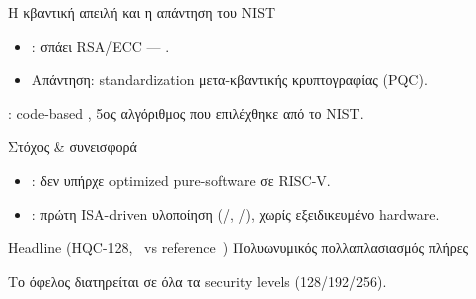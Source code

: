\documentclass[aspectratio=169,10pt]{beamer}
\begin{document}
\begin{frame}{Η κβαντική απειλή και η απάντηση του NIST}
  \begin{itemize}
    \item {}: σπάει RSA/ECC — .
    \item Απάντηση: standardization μετα-κβαντικής κρυπτογραφίας (PQC).
  \end{itemize}
  \vspace{0.4em}
  \begin{center}
  \end{center}
  \vspace{0.2em}
  {\footnotesize \HQC: code-based \KEM, 5ος αλγόριθμος που επιλέχθηκε από το NIST.\par}
  \cite{Shor1997,NIST-HQC-selection2025}
\end{frame}

\begin{frame}{Στόχος \& συνεισφορά}
  \begin{itemize}
    \item {}: δεν υπήρχε optimized pure-software \HQC σε RISC-V.
    \item {}: πρώτη ISA-driven υλοποίηση (\Zbc/\Zvbc, \Zbb/\Zvbb),
          χωρίς εξειδικευμένο hardware.
  \end{itemize}
  \begin{block}{Headline (HQC-128, \instret\ vs reference~\cite{HQC-reference-impl})}
    Πολυωνυμικός πολλαπλασιασμός  \quad\textbar\quad πλήρες \KEM\ 
  \end{block}
  \centering\footnotesize\textcolor{neutral}{Το όφελος διατηρείται σε όλα τα security levels (128/192/256).}
\end{frame}
\end{document}
